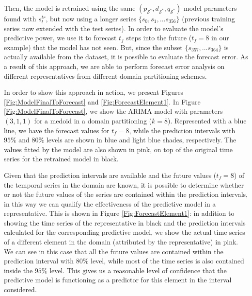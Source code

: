Then, the model is retrained using the same $(p_{\mathcal{S}^{*}}, d_{\mathcal{S}^{*}}, q_{\mathcal{S}^{*}})$ model parameters found with $s^{tr}_t$, but now using a longer series $\lbrace s_0, s_1, \ldots s_{356} \rbrace$ (previous training series now extended with the test series). In order to evaluate the model's predictive power, we use it to forecast $t_f$ steps into the future ($t_f = 8$ in our example) that the model has not seen. But, since the subset $\lbrace s_{357}, \ldots s_{364} \rbrace$ is actually available from the dataset, it is possible to evaluate the forecast error. As a result of this approach, we are able to perform forecast error analysis on different representatives from different domain partitioning schemes.

In order to show this approach in action, we present Figures \ref{Fig:ModelFinalToForecast} and \ref{Fig:ForecastElement1}. In Figure \ref{Fig:ModelFinalToForecast}, we show the ARIMA model with parameters $(3,1,1)$ for a medoid in a domain partitioning ($k=8$). Represented with a blue line, we have the forecast values for $t_{f} = 8$, while the prediction intervals with $95\%$ and $80\%$ levels are shown in blue and light blue shades, respectively. The values fitted by the model are also shown in pink, on top of the original time series for the retrained model in black.

Given that the prediction intervals are available and the future values ($t_f = 8$) of the temporal series in the domain are known, it is possible to determine whether or not the future values of the series are contained within the prediction intervals, in this way we can qualify the effectiveness of the predictive model in a representative. This is shown in Figure \ref{Fig:ForecastElement1}: in addition to showing the time series of the representative in black and the prediction intervals calculated for the corresponding predictive model, we show the actual time series of a different element in the domain (attributed by the representative) in pink. We can see in this case that all the future values are contained within the prediction interval with $80\%$ level, while most of the time series is also contained inside the $95\%$ level. This gives us a reasonable level of confidence that the predictive model is functioning as a predictor for this element in the interval considered.

